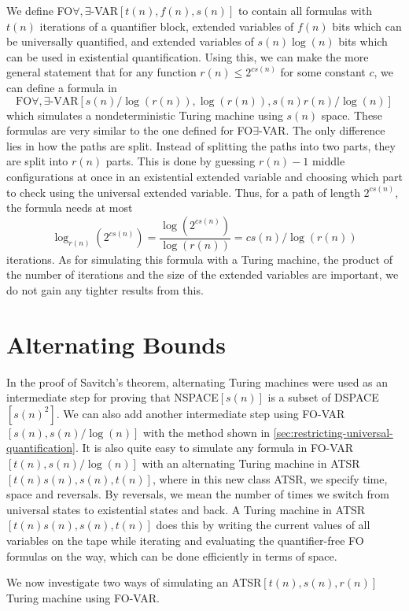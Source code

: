 We define FO$\forall, \exists$-VAR$[t(n), f(n), s(n)]$ to contain all formulas with $t(n)$ iterations of a quantifier block, extended variables of $f(n)$ bits which can be universally quantified, and extended variables of $s(n)\log(n)$ bits which can be used in existential quantification.
Using this, we can make the more general statement that for any function $r(n) \leq 2^{cs(n)}$ for some constant $c$, we can define a formula in \[\text{FO$\forall, \exists$-VAR$[s(n)/\log(r(n)), \log(r(n)), s(n)r(n)/\log(n)]$}\] which simulates a nondeterministic Turing machine using $s(n)$ space.
These formulas are very similar to the one defined for FO$\exists$-VAR\@.
The only difference lies in how the paths are split.
Instead of splitting the paths into two parts, they are split into $r(n)$ parts.
This is done by guessing $r(n) - 1$ middle configurations at once in an existential extended variable and choosing which part to check using the universal extended variable.
Thus, for a path of length $2^{cs(n)}$, the formula needs at most \[\log_{r(n)}\left(2^{cs(n)}\right) = \frac{\log\left(2^{cs(n)}\right)}{\log(r(n))} = cs(n)/\log(r(n))\] iterations.
As for simulating this formula with a Turing machine, the product of the number of iterations and the size of the extended variables are important, we do not gain any tighter results from this.


\section{Alternating Bounds}\label{sec:alternating-bounds}

In the proof of Savitch's theorem, alternating Turing machines were used as an intermediate step for proving that NSPACE$[s(n)]$ is a subset of DSPACE$[s(n)^2]$.
We can also add another intermediate step using FO-VAR$[s(n), s(n)/\log(n)]$ with the method shown in \cref{sec:restricting-universal-quantification}.
It is also quite easy to simulate any formula in FO-VAR$[t(n), s(n)/\log(n)]$ with an alternating Turing machine in ATSR$[t(n)s(n), s(n), t(n)]$, where in this new class ATSR, we specify time, space and reversals.
By reversals, we mean the number of times we switch from universal states to existential states and back.
A Turing machine in ATSR$[t(n)s(n), s(n), t(n)]$ does this by writing the current values of all variables on the tape while iterating and evaluating the quantifier-free FO formulas on the way, which can be done efficiently in terms of space.

We now investigate two ways of simulating an ATSR$[t(n), s(n), r(n)]$ Turing machine using FO-VAR\@.

